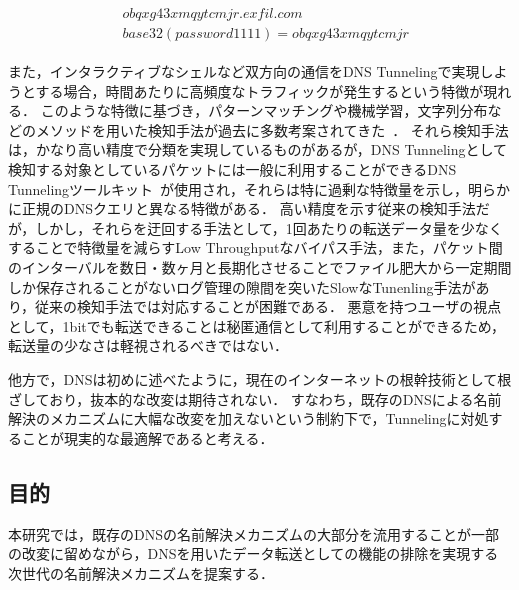 \begin{eqnarray}
 \label{eq:sample_qname}
 \begin{aligned}
  &obqxg43xmqytcmjr.exfil.com\\
  &base32(password1111) = obqxg43xmqytcmjr
 \end{aligned}
\end{eqnarray}

また，インタラクティブなシェルなど双方向の通信をDNS Tunnelingで実現しようとする場合，時間あたりに高頻度なトラフィックが発生するという特徴が現れる．
このような特徴に基づき，パターンマッチングや機械学習，文字列分布などのメソッドを用いた検知手法が過去に多数考案されてきた~\cite{born, cheng, liu, asaf, steadman, jawad}．
それら検知手法は，かなり高い精度で分類を実現しているものがあるが，DNS Tunnelingとして検知する対象としているパケットには一般に利用することができるDNS Tunnelingツールキット~\cite{ozymandns, iodine, dnscat2}が使用され，それらは特に過剰な特徴量を示し，明らかに正規のDNSクエリと異なる特徴がある．
高い精度を示す従来の検知手法だが，しかし，それらを迂回する手法として，1回あたりの転送データ量を少なくすることで特徴量を減らすLow Throughputなバイパス手法，また，パケット間のインターバルを数日・数ヶ月と長期化させることでファイル肥大から一定期間しか保存されることがないログ管理の隙間を突いたSlowなTunenling手法があり，従来の検知手法では対応することが困難である．
悪意を持つユーザの視点として，1bitでも転送できることは秘匿通信として利用することができるため，転送量の少なさは軽視されるべきではない．

他方で，DNSは初めに述べたように，現在のインターネットの根幹技術として根ざしており，抜本的な改変は期待されない．
すなわち，既存のDNSによる名前解決のメカニズムに大幅な改変を加えないという制約下で，Tunnelingに対処することが現実的な最適解であると考える．


\subsection{目的}
本研究では，既存のDNSの名前解決メカニズムの大部分を流用することが一部の改変に留めながら，DNSを用いたデータ転送としての機能の排除を実現する次世代の名前解決メカニズムを提案する．





